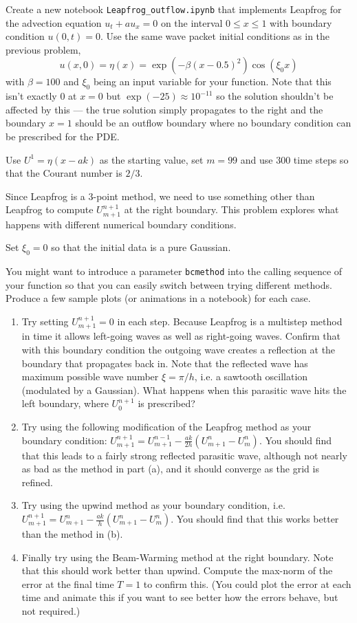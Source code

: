 \documentclass[10pt]{article}
\begin{document}
Create a new notebook \verb+Leapfrog_outflow.ipynb+ that 
implements Leapfrog for the advection equation $u_t + au_x=0$ on the
interval $0\leq x\leq 1$ with boundary condition $u(0,t) = 0$.
Use the same wave packet initial conditions as in the previous problem,
\[
u(x,0) = \eta(x) = \exp(-\beta(x-0.5)^2) \cos(\xi_0 x)
\]
with $\beta = 100$ and $\xi_0$ being an input variable for your function.
Note that this isn't exactly 0 at $x=0$ but $\exp(-25)\approx 10^{-11}$ so
the solution shouldn't be affected by this --- the true solution simply
propagates to the right and the boundary $x=1$ should be an outflow
boundary where no boundary condition can be prescribed for the PDE.  

Use $U^1= \eta(x - ak)$ as the starting value, set $m=99$ and use 300 time
steps so that the Courant number is $2/3$.

Since Leapfrog is a 3-point method, we need to use something other than
Leapfrog to compute $U_{m+1}^{n+1}$ at the right boundary.  
This problem explores what happens with different numerical boundary conditions.

Set $\xi_0 =0$ so that the initial data is a pure Gaussian.

You might want to introduce a parameter \verb+bcmethod+ into the calling
sequence of your function so that you can easily switch between trying
different methods.   Produce a few sample plots (or animations in a
notebook) for each case.

\begin{enumerate} 
\item Try setting $U_{m+1}^{n+1}= 0$ in each step.  Because Leapfrog is a
multistep method in time it allows left-going waves as well as right-going
waves.  Confirm that with this boundary condition the outgoing wave creates
a reflection at the boundary that propagates back in.  Note that the
reflected wave has maximum possible wave number $\xi = \pi/h$, i.e. a
sawtooth oscillation (modulated by a Gaussian). What happens when this
parasitic wave hits the left boundary, where $U_0^{n+1}$ is prescribed?

\item Try using the following modification of the Leapfrog method as
your boundary condition:
$U_{m+1}^{n+1} = U_{m+1}^{n-1} - \frac{ak}{2h}(U_{m+1}^n - U_m^n)$.
You should find that this leads to a fairly strong reflected parasitic wave,
although not nearly as bad as the method in part (a), and it should converge
as the grid is refined.

\item Try using the upwind method as your boundary condition,
i.e. $U_{m+1}^{n+1} = U_{m+1}^{n} - \frac{ak}{h}(U_{m+1}^n - U_m^n)$.
You should find that this works better than the method in (b).

\item Finally try using the Beam-Warming method at the right boundary.
Note that this should work better than upwind. Compute the max-norm of the
error at the final time $T=1$ to confirm this.
(You could plot the error at each time and animate this if you want to see
better how the errors behave, but not required.)

\end{enumerate} 
\end{document}
